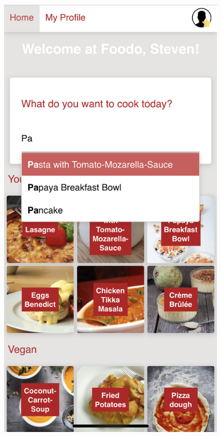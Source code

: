 \begin{figure}[htp]
	\includegraphics[scale=0.12]{Ressourcen/img/screenshots/iphone2.png}\hfill

\end{figure}
